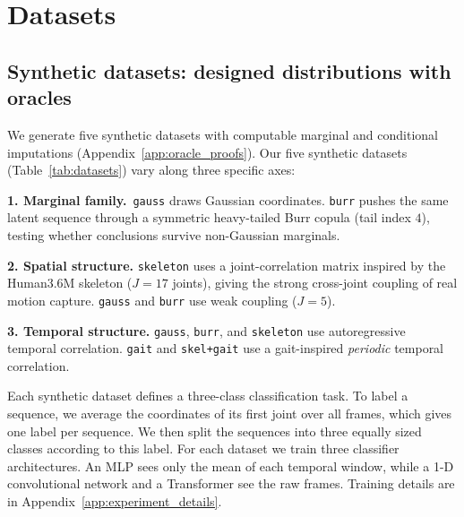 \section{Datasets}
\label{sec:datasets}

\subsection{Synthetic datasets: designed distributions with oracles}
\label{sec:datasets-synth}

We generate five synthetic datasets with computable marginal and conditional imputations (Appendix~\ref{app:oracle_proofs}). Our five synthetic datasets (Table~\ref{tab:datasets}) vary along three specific
axes:

\textbf{1. Marginal family.}~\texttt{gauss} draws Gaussian coordinates. \texttt{burr} pushes the same latent sequence through a symmetric heavy-tailed Burr copula (tail index $4$), testing whether conclusions survive non-Gaussian marginals.

\textbf{2. Spatial structure.} \texttt{skeleton} uses a joint-correlation matrix inspired by the Human3.6M skeleton  \citep{ionescu2014human36m} ($J{=}17$ joints), giving the strong cross-joint coupling of real motion capture.  \texttt{gauss} and \texttt{burr} use weak coupling ($J{=}5$).

\textbf{3. Temporal structure.}  \texttt{gauss}, \texttt{burr}, and  \texttt{skeleton} use autoregressive temporal correlation. \texttt{gait} and \texttt{skel+gait} use a gait-inspired \emph{periodic} temporal correlation.

Each synthetic dataset defines a three-class classification task. To label a sequence, we average the coordinates of its first joint over all frames, which gives one label per sequence. We then split the sequences into three equally sized classes according to this label. For each dataset we train three classifier architectures. An MLP
sees only the mean of each temporal window, while a 1-D convolutional
network \citep{lecun1998gradient} and a Transformer
\citep{vaswani2017attention} see the raw frames.
Training details are in Appendix~\ref{app:experiment_details}.

